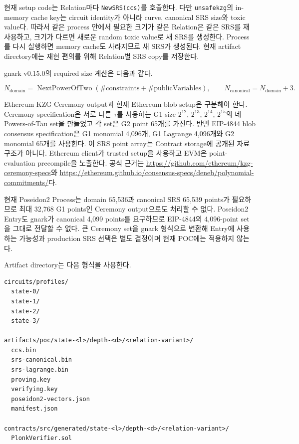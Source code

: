 \documentclass[11pt,a4paper]{extarticle}
\begin{document}
현재 setup code는 Relation마다 \texttt{NewSRS(ccs)}를 호출한다. 다만
\texttt{unsafekzg}의 in-memory cache key는 circuit identity가 아니라 curve, canonical
SRS size와 toxic value다. 따라서 같은 process 안에서 필요한 크기가 같은 Relation은
같은 SRS를 재사용하고, 크기가 다르면 새로운 random toxic value로 새 SRS를 생성한다.
Process를 다시 실행하면 memory cache도 사라지므로 새 SRS가 생성된다. 현재 artifact
directory에는 재현 편의를 위해 Relation별 SRS copy를 저장한다.

gnark v0.15.0의 required size 계산은 다음과 같다.

\[
N_{\mathrm{domain}}
=
\operatorname{NextPowerOfTwo}
\left(
\#\mathrm{constraints}+\#\mathrm{publicVariables}
\right),
\qquad
N_{\mathrm{canonical}}=N_{\mathrm{domain}}+3.
\]

Ethereum KZG Ceremony output과 현재 Ethereum blob setup은 구분해야 한다. Ceremony
specification은 서로 다른 $\tau$를 사용하는 G1 size $2^{12}$, $2^{13}$, $2^{14}$,
$2^{15}$의 네 Powers-of-Tau set을 만들었고 각 set은 G2 point 65개를 가진다. 반면
EIP-4844 blob consensus specification은 G1 monomial 4,096개, G1 Lagrange 4,096개와
G2 monomial 65개를 사용한다. 이 SRS point array는 Contract storage에 공개된 자료구조가
아니다. Ethereum client가 trusted setup을 사용하고 EVM은 point-evaluation precompile을
노출한다. 공식 근거는
\url{https://github.com/ethereum/kzg-ceremony-specs}와
\url{https://ethereum.github.io/consensus-specs/deneb/polynomial-commitments/}다.

현재 Poseidon2 Process는 domain 65,536과 canonical SRS 65,539 points가 필요하므로
최대 32,768 G1 points인 Ceremony output으로도 처리할 수 없다. Poseidon2 Entry도 gnark가
canonical 4,099 points를 요구하므로 EIP-4844의 4,096-point set을 그대로 전달할 수 없다.
큰 Ceremony set을 gnark 형식으로 변환해 Entry에 사용하는 가능성과 production SRS 선택은
별도 결정이며 현재 POC에는 적용하지 않는다.

\newpage
Artifact directory는 다음 형식을 사용한다.

\begin{verbatim}
circuits/profiles/
  state-0/
  state-1/
  state-2/
  state-3/

artifacts/poc/state-<l>/depth-<d>/<relation-variant>/
  ccs.bin
  srs-canonical.bin
  srs-lagrange.bin
  proving.key
  verifying.key
  poseidon2-vectors.json
  manifest.json

contracts/src/generated/state-<l>/depth-<d>/<relation-variant>/
  PlonkVerifier.sol
\end{verbatim}
\end{document}
